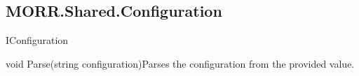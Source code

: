 \subsection*{MORR.Shared.Configuration}

\begin{interface}{IConfiguration}


    \begin{methods}
        \begin{method}{void Parse(string configuration)}{Parses the configuration from the provided value.}
            \begin{parameters}
            \end{parameters}
        \end{method}
    \end{methods}
\end{interface}